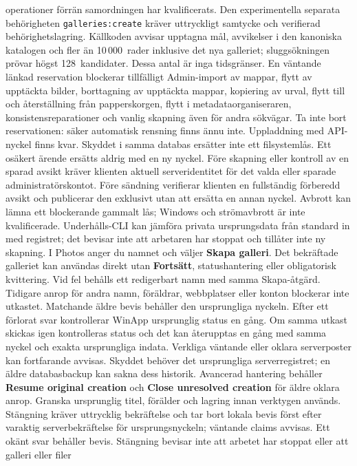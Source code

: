 \documentclass[11pt,a4paper]{article}
\newcommand{\ui}[1]{\textbf{#1}}
\begin{document}
operationer förrän samordningen har kvalificerats.
Den experimentella separata behörigheten \texttt{galleries:create} kräver
uttryckligt samtycke och verifierad behörighetslagring. Källkoden avvisar
upptagna mål, avvikelser i den kanoniska katalogen
och fler än 10\,000~rader inklusive det nya galleriet; sluggsökningen prövar
högst 128~kandidater. Dessa antal är inga tidsgränser.
En väntande länkad reservation blockerar tillfälligt Admin-import av mappar,
flytt av upptäckta bilder, borttagning av upptäckta mappar, kopiering av urval,
flytt till och återställning från papperskorgen, flytt i metadataorganiseraren,
konsistensreparationer och vanlig skapning
även för andra sökvägar. Ta inte bort reservationen:
säker automatisk rensning finns ännu inte. Uppladdning med API-nyckel finns
kvar. Skyddet i samma databas ersätter inte ett filsystemlås.
Ett osäkert ärende ersätts aldrig med en ny nyckel. Före skapning eller kontroll av
en sparad avsikt kräver klienten aktuell serveridentitet för det valda eller
sparade administratörskontot. Före sändning verifierar
klienten en fullständig förberedd avsikt och publicerar den exklusivt utan att
ersätta en annan nyckel. Avbrott kan lämna ett blockerande gammalt lås;
Windows och strömavbrott är inte kvalificerade. Underhålls-CLI kan jämföra
privata ursprungsdata från standard in med registret; det bevisar inte att
arbetaren har stoppat och tillåter inte ny skapning.
I Photos anger du namnet och väljer \ui{Skapa galleri}. Det bekräftade galleriet
kan användas direkt utan \ui{Fortsätt}, statushantering eller obligatorisk
kvittering. Vid fel behålls ett redigerbart namn med samma Skapa-åtgärd.
Tidigare anrop för andra namn, föräldrar, webbplatser eller konton blockerar
inte utkastet. Matchande äldre bevis behåller den ursprungliga nyckeln.
Efter ett förlorat svar kontrollerar WinApp ursprunglig status en gång.
Om samma utkast skickas igen kontrolleras status och det kan återupptas en
gång med samma nyckel och exakta ursprungliga indata. Verkliga väntande eller
oklara serverposter kan fortfarande avvisas. Skyddet behöver det ursprungliga
serverregistret; en äldre databasbackup kan sakna dess historik.
Avancerad hantering behåller \ui{Resume original creation} och
\ui{Close unresolved creation} för äldre oklara anrop. Granska ursprunglig
titel, förälder och lagring innan verktygen används. Stängning kräver uttrycklig
bekräftelse och tar bort lokala bevis först efter varaktig serverbekräftelse
för ursprungsnyckeln; väntande claims avvisas. Ett okänt svar behåller bevis.
Stängning bevisar inte att arbetet har stoppat eller att galleri eller filer
\end{document}

